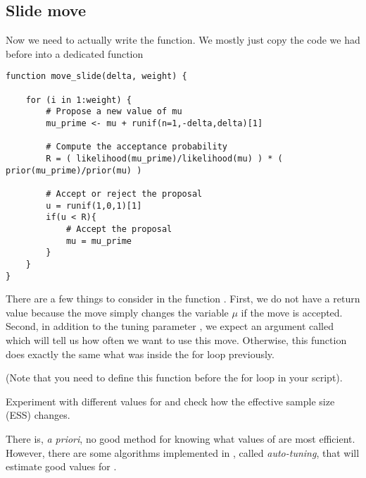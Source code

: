 \subsection{Slide move}
Now we need to actually write the  function.
We mostly just copy the code we had before into a dedicated function
{\tt \begin{snugshade*}
\begin{lstlisting}    
function move_slide(delta, weight) {

    for (i in 1:weight) {
        # Propose a new value of mu
        mu_prime <- mu + runif(n=1,-delta,delta)[1]

        # Compute the acceptance probability
        R = ( likelihood(mu_prime)/likelihood(mu) ) * ( prior(mu_prime)/prior(mu) ) 

        # Accept or reject the proposal
        u = runif(1,0,1)[1] 
        if(u < R){
            # Accept the proposal
            mu = mu_prime 
        }
    }
}
\end{lstlisting}
\end{snugshade*}}
There are a few things to consider in the function .
First, we do not have a return value because the move simply changes the variable $\mu$ if the move is accepted.
Second, in addition to the tuning parameter , we expect an argument called  which will tell us how often we want to use this move.
Otherwise, this function does exactly the same what was inside the for loop previously.

(Note that you need to define this function before the for loop in your script).

{\begin{framed}
Experiment with different values for  and check how the effective sample size (ESS) changes.
\end{framed}}

There is, {\it a priori}, no good method for knowing what values of  are most efficient.
However, there are some algorithms implemented in \RevBayes, called \emph{auto-tuning}, that will estimate good values for .

